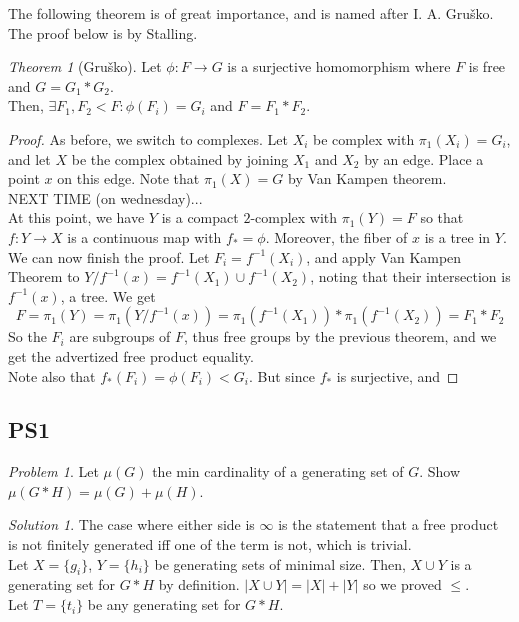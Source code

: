 \documentclass[11pt]{article}
\theoremstyle{definition}
\theoremstyle{example}
\theoremstyle{remark}
\theoremstyle{lemma}
\theoremstyle{proposition}
\theoremstyle{Problem}
\newtheorem{problem}{Problem}[section]
\theoremstyle{Solution}
\newtheorem{solution}{Solution}[section]
\theoremstyle{theorem}
\newtheorem{theorem}{Theorem}[section]
\begin{document}
The following theorem is of great importance, and is named after I. A. Gru\v{s}ko. The proof below is by Stalling.
\begin{theorem}[Gru\v{s}ko]
Let $\phi: F \to G$ is a surjective homomorphism where $F$ is free and $G = G_1 * G_2$.\\
Then, $\exists F_1, F_2 < F : \phi(F_i) = G_i$ and $F = F_1 * F_2$.
\end{theorem}
\begin{proof}
As before, we switch to complexes. Let $X_i$ be complex with $\pi_1(X_i) = G_i$, and let $X$ be the complex obtained by joining $X_1$ and $X_2$ by an edge. Place a point $x$ on this edge. Note that $\pi_1(X) = G$ by Van Kampen theorem.\\
NEXT TIME (on wednesday)...\\
At this point, we have $Y$ is a compact $2$-complex with $\pi_1(Y) = F$ so that $f:Y\to X$ is a continuous map with $f_* = \phi$. Moreover, the fiber of $x$ is a tree in $Y$.\\
We can now finish the proof. Let $F_i = f^{-1}(X_i)$, and apply Van Kampen Theorem to $Y/f^{-1}(x) = f^{-1}(X_1) \cup f^{-1}(X_2)$, noting that their intersection is $f^{-1}(x)$, a tree. We get 
$$F = \pi_1(Y) = \pi_1(Y/f^{-1}(x)) = \pi_1(f^{-1}(X_1))*\pi_1(f^{-1}(X_2)) = F_1*F_2$$
So the $F_i$ are subgroups of $F$, thus free groups by the previous theorem, and we get the advertized free product equality. \\
Note also that $f_*(F_i) = \phi(F_i) < G_i$. But since $f_*$ is surjective, and 
\end{proof}



\subsection{PS1}
\begin{problem}
Let $\mu(G)$ the min cardinality of a generating set of $G$. Show $\mu(G*H) = \mu(G) + \mu(H)$.
\end{problem}
\begin{solution}
The case where either side is $\infty$ is the statement that a free product is not finitely generated iff one of the term is not, which is trivial.\\
Let $X=\{g_i\}$, $Y=\{h_i\}$ be generating sets of minimal size. Then, $X\cup Y$ is a generating set for $G*H$ by definition. $|X\cup Y| = |X| + |Y|$ so we proved $\leq$.\\
Let $T=\{t_i\}$ be any generating set for $G*H$.
\end{solution}
\end{document}

